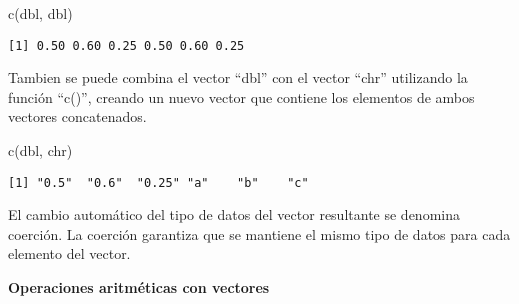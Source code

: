 \documentclass[
  a4paper,
]{article}
\newenvironment{Shaded}{}{}
\newcommand{\FunctionTok}[1]{\textcolor[rgb]{0.44,0.26,0.76}{#1}}
\newcommand{\NormalTok}[1]{\textcolor[rgb]{0.14,0.16,0.18}{#1}}
\begin{document}
\begin{enumerate}
\begin{Shaded}
\begin{Highlighting}[]
\FunctionTok{c}\NormalTok{(dbl, dbl)}
\end{Highlighting}
\end{Shaded}

\begin{verbatim}
[1] 0.50 0.60 0.25 0.50 0.60 0.25
\end{verbatim}

  Tambien se puede combina el vector ``dbl'' con el vector ``chr''
  utilizando la función ``c()'', creando un nuevo vector que contiene
  los elementos de ambos vectores concatenados.

\begin{Shaded}
\begin{Highlighting}[]
\FunctionTok{c}\NormalTok{(dbl, chr)}
\end{Highlighting}
\end{Shaded}

\begin{verbatim}
[1] "0.5"  "0.6"  "0.25" "a"    "b"    "c"   
\end{verbatim}
\end{enumerate}

\begin{tcolorbox}[enhanced jigsaw, bottomrule=.15mm, opacityback=0, colframe=quarto-callout-note-color-frame, toptitle=1mm, rightrule=.15mm, colback=white, bottomtitle=1mm, title=\textcolor{quarto-callout-note-color}{\faInfo}\hspace{0.5em}{Nota}, breakable, colbacktitle=quarto-callout-note-color!10!white, toprule=.15mm, leftrule=.75mm, opacitybacktitle=0.6, coltitle=black, titlerule=0mm, arc=.35mm, left=2mm]

El cambio automático del tipo de datos del vector resultante se denomina
coerción. La coerción garantiza que se mantiene el mismo tipo de datos
para cada elemento del vector.

\end{tcolorbox}

\textbf{Operaciones aritméticas con vectores}
\end{document}
